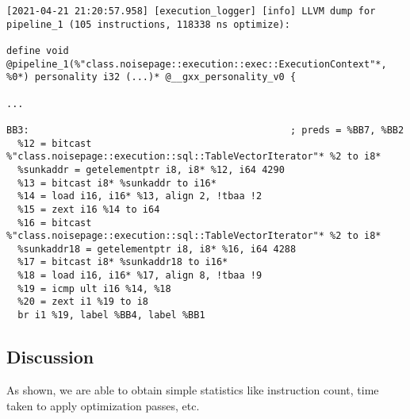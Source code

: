 \documentclass{vldb}
\begin{document}
\begin{lstlisting}
[2021-04-21 21:20:57.958] [execution_logger] [info] LLVM dump for pipeline_1 (105 instructions, 118338 ns optimize):

define void @pipeline_1(%"class.noisepage::execution::exec::ExecutionContext"*, %0*) personality i32 (...)* @__gxx_personality_v0 {

...

BB3:                                              ; preds = %BB7, %BB2
  %12 = bitcast %"class.noisepage::execution::sql::TableVectorIterator"* %2 to i8*
  %sunkaddr = getelementptr i8, i8* %12, i64 4290
  %13 = bitcast i8* %sunkaddr to i16*
  %14 = load i16, i16* %13, align 2, !tbaa !2
  %15 = zext i16 %14 to i64
  %16 = bitcast %"class.noisepage::execution::sql::TableVectorIterator"* %2 to i8*
  %sunkaddr18 = getelementptr i8, i8* %16, i64 4288
  %17 = bitcast i8* %sunkaddr18 to i16*
  %18 = load i16, i16* %17, align 8, !tbaa !9
  %19 = icmp ult i16 %14, %18
  %20 = zext i1 %19 to i8
  br i1 %19, label %BB4, label %BB1
\end{lstlisting}

\subsection{Discussion}

As shown, we are able to obtain simple statistics like instruction count, time taken to apply optimization passes, etc.


\newcommand{\newblock}{}

\newpage
\balance


\end{document}
